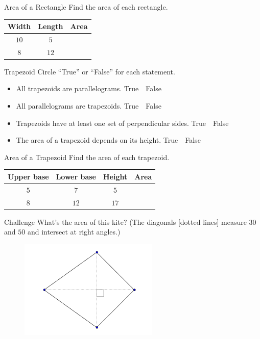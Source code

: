 \documentclass[12pt,letterpaper]{article}
\begin{document}
\begin{problem}{Area of a Rectangle}
 Find the area of each rectangle.

 \begin{center}
  \begin{tabular}{|c|c|c|}
   \hline
   Width & Length & Area \\
   \hline
   $10$ & $5$ & \\
   $8$ & $12$ & \\
   \hline
  \end{tabular}
 \end{center}
\end{problem}

\begin{problem}{Trapezoid}
 Circle ``True'' or ``False'' for each statement.
 \begin{itemize}
  \item All trapezoids are parallelograms. \hfill True~~False
  \item All parallelograms are trapezoids. \hfill True~~False
  \item Trapezoids have at least one set of perpendicular sides.
  \hfill True~~False
  \item The area of a trapezoid depends on its height. \hfill True~~False
 \end{itemize}
\end{problem}

\begin{problem}{Area of a Trapezoid}
 Find the area of each trapezoid.

 \begin{center}
 \begin{tabular}{|c|c|c|c|}
  \hline
  Upper base & Lower base & Height & Area \\
  \hline
  $5$ & $7$ & $5$ & \\
  $8$ & $12$ & $17$ & \\
  \hline
 \end{tabular}
 \end{center}
\end{problem}

\begin{problem}{Challenge}
 What's the area of this kite? (The diagonals [dotted lines] measure $30$ and
 $50$ and intersect at right angles.)

 \begin{figure}[h]
 \includegraphics[width=250px]{kite.png}
 \end{figure}
\end{problem}
\end{document}
